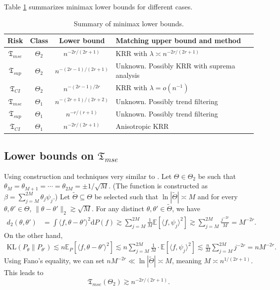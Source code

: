 \documentclass[11pt,a4paper]{article}
\renewcommand{\tilde}{\widetilde}
\theoremstyle{definition}
\theoremstyle{plain}
\theoremstyle{remark}
\newcommand{\ud}{\mathrm d}
\begin{document}
Table \ref{tab:summary} summarizes minimax lower bounds for different cases.
\begin{table}[h]
\centering
\caption{Summary of minimax lower bounds.}
\label{tab:summary}
\begin{tabular}{cccl}
\hline
Risk& Class& Lower bound& Matching upper bound and method\\ 
\hline
$\mathfrak T_{mse}$& $\Theta_2$& $n^{-2r/(2r+1)}$& KRR with $\lambda\asymp n^{-2r/(2r+1)}$\\
$\mathfrak T_{sup}$& $\Theta_2$& $n^{-(2r-1)/(2r+1)}$& Unknown. Possibly KRR with suprema analysis\\
$\mathfrak T_{CI}$& $\Theta_2$& $n^{-(2r-1)/2r}$& KRR with $\lambda = o(n^{-1})$\\
$\mathfrak T_{mse}$& $\Theta_1$& $n^{-(2r+1)/(2r+2)}$& Unknown. Possibly trend filtering\\
$\mathfrak T_{sup}$& $\Theta_1$& $n^{-r/(r+1)}$& Unknown. Possibly trend filtering\\
$\mathfrak T_{CI}$& $\Theta_1$& $n^{-2r/(2r+1)}$& Anisotropic KRR\\
\hline
\end{tabular}
\end{table}

\subsection{Lower bounds on $\mathfrak T_{mse}$}

Using construction and techniques very similar to \cite{cai2012minimax}.
Let $\Theta\in\Theta_2$ be such that $\theta_M=\theta_{M+1}=\cdots=\theta_{2M}=\pm 1/\sqrt{M}$. (The function is constructed as $\beta = \sum_{j=M}^{2M}\theta_j\psi_j$.)
Let $\tilde\Theta\subseteq\Theta$ be selected such that $\ln|\tilde\Theta|\asymp M$ and for every $\theta,\theta'\in\Theta$, $\|\theta-\theta'\|_2\gtrsim \sqrt{M}$.
For any distinct $\theta,\theta'\in\tilde\Theta$, we have
\begin{align*}
d_2(\theta,\theta') &= \int \langle f,\theta-\theta'\rangle^2\ud P(f)\gtrsim \sum_{j=M}^{2M} \frac{1}{M}\mathbb E[\langle f,\psi_j\rangle^2] \gtrsim \sum_{j=M}^{2M} \frac{j^{-2r}}{M} = M^{-2r}.
\end{align*}
On the other hand,
\begin{align*}
\mathrm{KL}(P_{\theta}\|P_{\theta'}) \lesssim n\mathbb E_P[\langle f,\theta-\theta'\rangle^2] \lesssim n\sum_{j=M}^{2M}\frac{1}{M}\cdot \mathbb E[\langle f,\psi_j\rangle^2]\lesssim \frac{n}{M}\sum_{j=M}^{2M}j^{-2r} = nM^{-2r}.
\end{align*}
Using Fano's equality, we can set $nM^{-2r}\ll \ln|\tilde\Theta|\asymp M$, meaning $M\asymp n^{1/(2r+1)}$. This leads to
$$
\mathfrak T_{mse}(\Theta_2) \gtrsim n^{-2r/(2r+1)}.
$$
\end{document}
